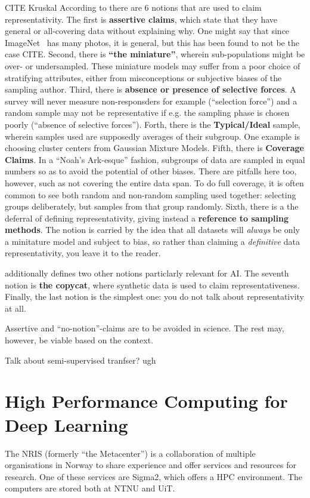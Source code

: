 \documentclass[10pt,twocolumn,letterpaper]{article}
\begin{document}
CITE Kruskal
According to there are 6 notions that are used to claim representativity.
The first is \textbf{assertive claims}, which state that they have general or all-covering data without explaining why. One might say that since ImageNet~\cite{imageNet} has many photos, it is general, but this has been found to not be the case CITE.
Second, there is \textbf{``the miniature''}, wherein sub-populations might be over- or undersampled. These miniature models may suffer from a poor choice of stratifying attributes, either from misconceptions or subjective biases of the sampling author.
Third, there is \textbf{absence or presence of selective forces}. A survey will never measure non-responsders for example (``selection force'') and a random sample may not be representative if e.g. the sampling phase is chosen poorly (``absence of selective forces'').
Forth, there is the \textbf{Typical/Ideal} sample, wherein samples used are supposedly averages of their subgroup. One example is choosing cluster centers from Gaussian Mixture Models.
Fifth, there is \textbf{Coverage Claims}. In a ``Noah's Ark-esque'' fashion, subgroups of data are sampled in equal numbers so as to avoid the potential of other biases. There are pitfalls here too, however, such as not covering the entire data span. To do full coverage, it is often common to see both random and non-random sampling used together: selecting groups deliberately, but samples from that group randomly.
Sixth, there is a the deferral of defining representativity, giving instead a \textbf{reference to sampling methods}. The notion is carried by the idea that all datasets will \textit{always} be only a minitature model and subject to bias, so rather than claiming a \textit{definitive} data representativity, you leave it to the reader. 

 additionally defines two other notions particlarly relevant for \gls{AI}. The seventh notion is \textbf{the copycat}, where synthetic data is used to claim representativeness. Finally, the last notion is the simplest one: you do not talk about representativity at all. 

Assertive and ``no-notion''-claims are to be avoided in science. The rest may, however, be viable based on the context.

Talk about semi-supervised tranfser? ugh

\section{High Performance Computing for Deep Learning}
The \gls{NRIS} (formerly ``the Metacenter'') is a collaboration of multiple organisations in Norway to share experience and offer services and resources for research. One of these services are Sigma2, which offers a \gls{HPC} environment. The computers are stored both at NTNU and UiT.
\end{document}
